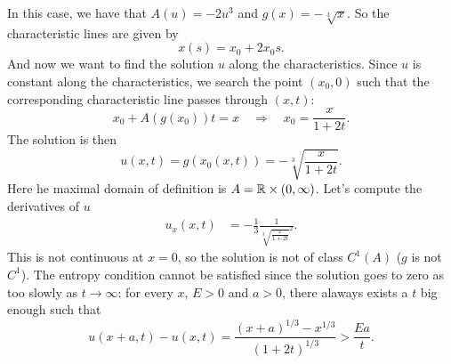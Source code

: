 \begin{enumerate}
          In this case, we have that \(A(u) = -2u^3\) and \(g(x) = -\sqrt[3]{x}\). So the
          characteristic lines are given by
          \[
              x(s) = x_0 + 2 x_0 s.
          \]
          And now we want to find the solution \(u\) along the characteristics. Since
          \(u\) is constant along the characteristics, we search the point \((x_0, 0)\)
          such that the corresponding characteristic line passes through \((x, t)\):
          \[
              x_0 + A(g(x_0)) t = x \quad \Rightarrow \quad x_0 = \frac{x}{1+2t}.
          \]
          The solution is then
          \[
              u(x,t) = g(x_0(x,t)) = -\sqrt[3]{\frac{x}{1+2t}}.
          \]
          Here he maximal domain of definition is \(A = \mathbb{R} \times (0, \infty)\). Let's
          compute the derivatives of \(u\)
          \begin{align*}
              u_x(x,t) & = -\frac{1}{3} \frac{1}{\sqrt[3]{\frac{x}{1+2t}}^2}.
          \end{align*}
          This is not continuous at \(x=0\), so the solution is not of class \(C^1(A)\) ($g$ is not $C^1$).
          The entropy condition cannot be satisfied since the solution goes to zero as too slowly as \(t \to \infty\):
          for every $x$, $E>0$ and $a > 0$, there alaways exists a $t$ big enough such that
          \[
              u(x+a,t) - u(x,t) = \frac{(x+a)^{1/3}-x^{1/3}}{(1+2t)^{1/3}} > \frac{Ea}{t}.
          \]
\end{enumerate}

